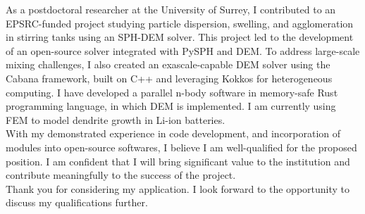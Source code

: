 \documentclass[11pt,a4paper,roman]{moderncv}
\begin{document}
\vspace{1em}
As a postdoctoral researcher at the University of Surrey, I
contributed to an EPSRC-funded project studying particle dispersion,
swelling, and agglomeration in stirring tanks using an SPH-DEM
solver. This project led to the development of an open-source solver
integrated with PySPH and DEM. To address large-scale mixing
challenges, I also created an exascale-capable DEM solver using the
Cabana framework, built on C++ and leveraging Kokkos for heterogeneous
computing.  I have developed a parallel n-body software in memory-safe
Rust programming language, in which DEM is implemented.  I am
currently using FEM to model dendrite growth in Li-ion batteries.\\


\vspace{1em}
With my demonstrated experience in code development, and incorporation
of modules into open-source softwares, I believe I am well-qualified for
the proposed position. I am confident that I will bring
significant value to the institution and contribute meaningfully to
the success of the project.\\


\vspace{1em}
Thank you for considering my application. I look forward to the
opportunity to discuss my qualifications further.\\



\vspace{0.5cm}


\makeletterclosing
\end{document}
